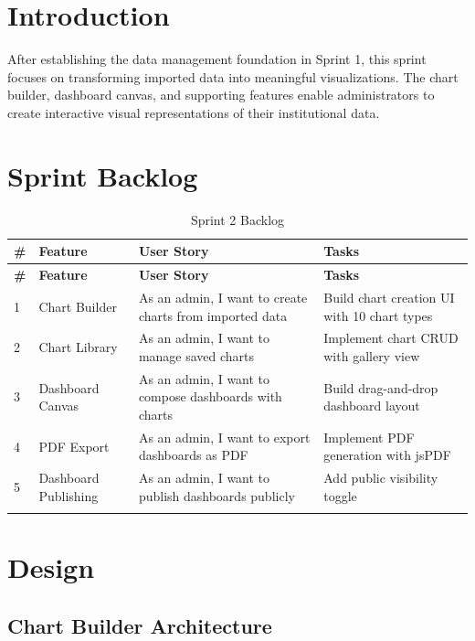 \documentclass[12pt,a4paper]{report}
\begin{document}
\section{Introduction}

After establishing the data management foundation in Sprint 1, this sprint focuses on transforming imported data into meaningful visualizations. The chart builder, dashboard canvas, and supporting features enable administrators to create interactive visual representations of their institutional data.

\section{Sprint Backlog}

\begin{table}[H]\begin{tabular}{|p{0.5cm}|p{2.5cm}|p{4cm}|p{2.5cm}|}
\hline
\textbf{\#} & \textbf{Feature} & \textbf{User Story} & \textbf{Tasks} \\
\hline

\hline
\textbf{\#} & \textbf{Feature} & \textbf{User Story} & \textbf{Tasks} \\
\hline

1 & Chart Builder & As an admin, I want to create charts from imported data & Build chart creation UI with 10 chart types \\
2 & Chart Library & As an admin, I want to manage saved charts & Implement chart CRUD with gallery view \\
3 & Dashboard Canvas & As an admin, I want to compose dashboards with charts & Build drag-and-drop dashboard layout \\
4 & PDF Export & As an admin, I want to export dashboards as PDF & Implement PDF generation with jsPDF \\
5 & Dashboard Publishing & As an admin, I want to publish dashboards publicly & Add public visibility toggle \\
\hline
\caption{Sprint 2 Backlog}
\end{tabular}\end{table}

\section{Design}

\subsection{Chart Builder Architecture}
\end{document}
